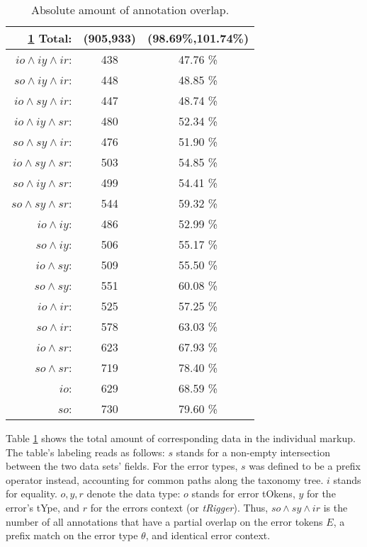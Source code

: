\documentclass{article}
\begin{document}
\begin{table}
  \centering
\begin{tabular}{r|c|c}\ref{tab:1}
  Total: & (905,933)& (98.69\%,101.74\%)\\\hline
  $io \wedge iy \wedge ir$:& 438 & 47.76 \%\\
  $so \wedge iy \wedge ir$:& 448 & 48.85 \%\\
  $io \wedge sy \wedge ir$:& 447 & 48.74 \%\\
  $io \wedge iy \wedge sr$:& 480 & 52.34 \%\\
  $so \wedge sy \wedge ir$:& 476 & 51.90 \%\\
  $io \wedge sy \wedge sr$:& 503 & 54.85 \%\\
  $so \wedge iy \wedge sr$:& 499 & 54.41 \%\\
  $so \wedge sy \wedge sr$:& 544 & 59.32 \%\\
  $     io \wedge iy$:& 486      & 52.99 \%\\
  $     so \wedge iy$:& 506      & 55.17 \%\\
  $     io \wedge sy$:& 509      & 55.50 \%\\
  $     so \wedge sy$:& 551      & 60.08 \%\\
  $     io \wedge ir$:& 525      & 57.25 \%\\
  $     so \wedge ir$:& 578      & 63.03 \%\\
  $     io \wedge sr$:& 623      & 67.93 \%\\
  $     so \wedge sr$:& 719      & 78.40 \%\\
  $          io$:& 629           & 68.59 \%\\
  $          so$:& 730           & 79.60 \%\\
\end{tabular}
\caption{Absolute amount of annotation overlap.}\label{tab:1}

\end{table}

Table \ref{tab:1} shows the total amount of corresponding data in the individual
markup. The table's labeling reads as follows: $s$ stands for a non-empty
intersection between the two data sets' fields. For the error types, $s$ was
defined to be a prefix operator instead, accounting for common paths along the
taxonomy tree.  $i$ stands for equality.  $o,y,r$ denote the data type: $o$
stands for error tOkens, $y$ for the error's tYpe, and $r$ for the errors
context (or \textit{tRigger}). Thus, $so\wedge sy\wedge ir$ is the number of all
annotations that have a partial overlap on the error tokens $E$, a prefix match
on the error type $\theta$, and identical error context.
\end{document}
